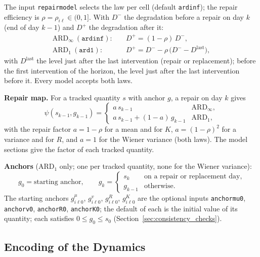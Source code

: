 \documentclass[11pt,a4paper]{article}
\theoremstyle{plain}
\theoremstyle{definition}
\newcommand{\ARDinf}{\mathrm{ARD}_{\infty}}
\newcommand{\ARDone}{\mathrm{ARD}_{1}}
\renewcommand{\_}{\textunderscore\allowbreak{}}
\begin{document}
The input \texttt{repair\_model} selects the law per cell (default \texttt{ardinf});
the repair efficiency is $\rho = \rho_{i\ell} \in (0, 1]$. With $D^-$ the degradation
before a repair on day $k$ (end of day $k-1$) and $D^+$ the degradation after it:
\begin{align}
  \ARDinf\ (\texttt{ardinf}):&\quad D^+ = (1-\rho)\, D^- ,
    \label{eq:a_ardinf} \\
  \ARDone\ (\texttt{ard1}):&\quad D^+ = D^- - \rho\,\bigl(D^- - D^{\mathrm{last}}\bigr),
    \label{eq:a_ard1}
\end{align}
with $D^{\mathrm{last}}$ the level just after the last intervention (repair or
replacement); before the first intervention of the horizon, the level just after the
last intervention before it. Every model accepts both laws.

\textbf{Repair map.} For a tracked quantity $s$ with anchor $g$, a repair on day $k$
gives
\begin{equation}
  \psi(s_{k-1}, g_{k-1}) =
  \begin{cases}
    a\, s_{k-1} & \ARDinf, \\
    a\, s_{k-1} + (1-a)\, g_{k-1} & \ARDone,
  \end{cases}
  \label{eq:a_psi}
\end{equation}
with the repair factor $a = 1 - \rho$ for a mean and for $K$, $a = (1-\rho)^2$ for a
variance and for $R$, and $a = 1$ for the Wiener variance (both laws). The model
sections give the factor of each tracked quantity.

\textbf{Anchors} ($\ARDone$ only; one per tracked quantity, none for the Wiener
variance):
\begin{equation}
  g_0 = \text{starting anchor}, \qquad
  g_k = \begin{cases}
    s_k & \text{on a repair or replacement day}, \\
    g_{k-1} & \text{otherwise}.
  \end{cases}
  \label{eq:a_anchor}
\end{equation}
The starting anchors $g^{\mu}_{i\ell 0}$, $g^{v}_{i\ell 0}$, $g^{R}_{i\ell 0}$,
$g^{K}_{i\ell 0}$ are the optional inputs \texttt{anchor\_mu\_0}, \texttt{anchor\_v\_0},
\texttt{anchor\_R\_0}, \texttt{anchor\_K\_0}; the default of each is the initial value
of its quantity; each satisfies $0 \leq g_0 \leq s_0$
(Section~\ref{sec:consistency_checks}).

\subsection{Encoding of the Dynamics}
\label{sec:encoding}
\end{document}
